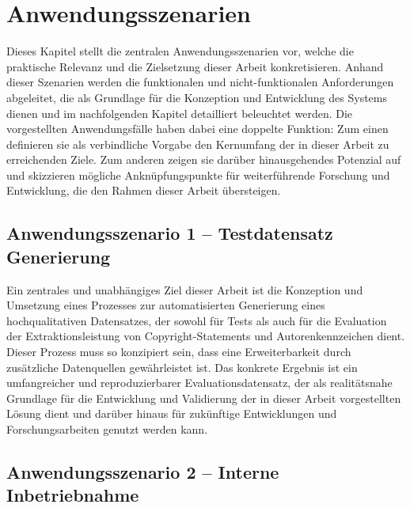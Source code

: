 \chapter{Anwendungsszenarien}\label{ch:anwendungsszenarien}

Dieses Kapitel stellt die zentralen Anwendungsszenarien vor, welche die praktische Relevanz und die Zielsetzung dieser Arbeit konkretisieren.
Anhand dieser Szenarien werden die funktionalen und nicht-funktionalen Anforderungen abgeleitet, die als Grundlage für die Konzeption und Entwicklung des Systems dienen und im nachfolgenden Kapitel  detailliert beleuchtet werden.
Die vorgestellten Anwendungsfälle haben dabei eine doppelte Funktion: Zum einen definieren sie als verbindliche Vorgabe den Kernumfang der in dieser Arbeit zu erreichenden Ziele.
Zum anderen zeigen sie darüber hinausgehendes Potenzial auf und skizzieren mögliche Anknüpfungspunkte für weiterführende Forschung und Entwicklung, die den Rahmen dieser Arbeit übersteigen.


\section{Anwendungsszenario 1 -- Testdatensatz Generierung}\label{sec:anwendungsszenario-1}

Ein zentrales und unabhängiges Ziel dieser Arbeit ist die Konzeption und Umsetzung eines Prozesses zur automatisierten Generierung eines hochqualitativen Datensatzes, der sowohl für Tests als auch für die Evaluation der Extraktionsleistung von Copyright-Statements und Autorenkennzeichen dient.
Dieser Prozess muss so konzipiert sein, dass eine Erweiterbarkeit durch zusätzliche Datenquellen gewährleistet ist.
Das konkrete Ergebnis ist ein umfangreicher und reproduzierbarer Evaluationsdatensatz, der als realitätsnahe Grundlage für die Entwicklung und Validierung der in dieser Arbeit vorgestellten Lösung dient und darüber hinaus für zukünftige Entwicklungen und Forschungsarbeiten genutzt werden kann.


\section{Anwendungsszenario 2 -- Interne Inbetriebnahme}\label{sec:anwendungsszenario-2}

